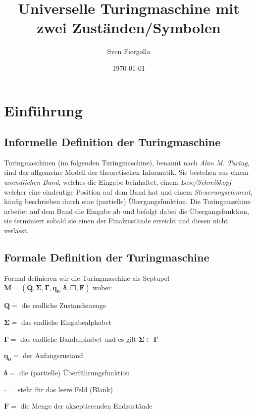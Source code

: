 \documentclass[12pt, a4paper]{article}
\author{Sven Fiergolla}
\title{Universelle Turingmaschine mit zwei Zuständen/Symbolen}
\date{\today}
\begin{document}
 
\maketitle


\section{Einführung}
\subsection{Informelle Definition der Turingmaschine}

Turingmaschinen (im folgenden Turingmaschine), benannt nach \textit{Alan M. Turing}, sind das allgemeine Modell der theoretischen Informatik.
Sie bestehen aus einem \textit{unendlichen Band}, welches die Eingabe beinhaltet, einem \textit{Lese/Schreibkopf} welcher eine eindeutige Position auf dem Band hat und einem \textit{Steuerungselement}, häufig beschrieben durch eine (partielle) Übergangsfunktion.
Die Turingmaschine arbeitet auf dem Band die Eingabe ab und befolgt dabei die Übergangsfunktion, sie terminiert sobald sie einen der Finalzustände erreicht und diesen nicht verlässt.



\subsection{Formale Definition der Turingmaschine}
Formal definieren wir die Turingmaschine als Septupel $\mathbf{ M = (Q,\Sigma,\Gamma,q_0,\delta,\Square,F)} $
 wobei:

\begin{description}


 \item $\mathbf{ Q = }$ die endliche Zustandsmenge
 \item $\mathbf{ \Sigma = }$ das endliche Eingabealphabet
 \item $\mathbf{ \Gamma = }$ das endliche Bandalphabet und es gilt $\mathbf{\Sigma\subset\Gamma}$
 \item $\mathbf{ q_0 = }$ der Anfangszustand
 \item $\mathbf{ \delta = }$ die (partielle) Überführungsfunktion
 \item $\mathbf{ \square = }$ steht für das leere Feld (Blank)
 \item $\mathbf{F = }$ die Menge der akzeptierenden Endzustände

\end{description}
\end{document}
